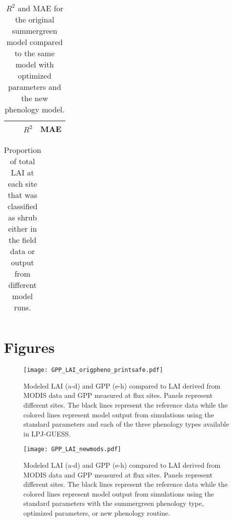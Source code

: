 \documentclass[]{article}
\begin{document}
\begin{table}[ht]
	\begin{threeparttable} %
		\caption{$R^2$ and MAE for the original summergreen model compared to the same model with optimized parameters and the new phenology model.} 
		\begin{tabular}{llrrrr}
			\toprule
			&& \multicolumn{2}{c}{$R^2$} & \multicolumn{2}{c}{MAE} \\
			\cmidrule(lr){3-4} \cmidrule(lr){5-6}
			
			\bottomrule
		\end{tabular}
	\end{threeparttable}
\end{table}

\begin{table}[ht]
	\begin{threeparttable} %
		\caption{Proportion of total LAI at each site that was classified as shrub either in the field data or output from different model runs.} 
		\begin{tabular}{lrrrr}
			\toprule
			
		\end{tabular}
	\end{threeparttable}
\end{table}

\section{Figures}

\begin{figure}[!htbp]
\begin{measuredfigure}
	\texttt{[image: GPP\_LAI\_origpheno\_printsafe.pdf]}
	\caption{Modeled LAI (a-d) and GPP (e-h) compared to LAI derived from MODIS data and GPP measured at flux sites. Panels represent different sites. The black lines represent the reference data while the colored lines represent model output from simulations using the standard parameters and each of the three phenology types available in LPJ-GUESS.}
	\label{fig:origpheno}
	\end{measuredfigure}
\end{figure}

\begin{figure}[!htbp]
	\begin{measuredfigure}
		\texttt{[image: GPP\_LAI\_newmods.pdf]}
		\caption{Modeled LAI (a-d) and GPP (e-h) compared to LAI derived from MODIS data and GPP measured at flux sites. Panels represent different sites. The black lines represent the reference data while the colored lines represent model output from simulations using the standard parameters with the summergreen phenology type, optimized parameters, or new phenology routine.}
		\label{fig:newphen}
	\end{measuredfigure}
\end{figure}
\end{document}
